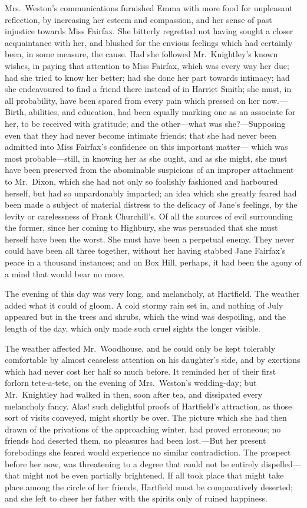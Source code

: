 Mrs.\ Weston's communications furnished Emma with more food for
unpleasant reflection, by increasing her esteem and compassion,
and her sense of past injustice towards Miss Fairfax.  She bitterly
regretted not having sought a closer acquaintance with her, and blushed
for the envious feelings which had certainly been, in some measure,
the cause.  Had she followed Mr.\ Knightley's known wishes, in paying
that attention to Miss Fairfax, which was every way her due; had she
tried to know her better; had she done her part towards intimacy;
had she endeavoured to find a friend there instead of in Harriet Smith;
she must, in all probability, have been spared from every pain
which pressed on her now.---Birth, abilities, and education,
had been equally marking one as an associate for her, to be received
with gratitude; and the other---what was she?---Supposing even that
they had never become intimate friends; that she had never been
admitted into Miss Fairfax's confidence on this important matter---%
which was most probable---still, in knowing her as she ought,
and as she might, she must have been preserved from the abominable
suspicions of an improper attachment to Mr.\ Dixon, which she had
not only so foolishly fashioned and harboured herself, but had so
unpardonably imparted; an idea which she greatly feared had been made
a subject of material distress to the delicacy of Jane's feelings,
by the levity or carelessness of Frank Churchill's.  Of all the sources
of evil surrounding the former, since her coming to Highbury,
she was persuaded that she must herself have been the worst.
She must have been a perpetual enemy.  They never could have been
all three together, without her having stabbed Jane Fairfax's peace
in a thousand instances; and on Box Hill, perhaps, it had been
the agony of a mind that would bear no more.

The evening of this day was very long, and melancholy, at Hartfield.
The weather added what it could of gloom.  A cold stormy rain set in,
and nothing of July appeared but in the trees and shrubs, which the
wind was despoiling, and the length of the day, which only made
such cruel sights the longer visible.

The weather affected Mr.\ Woodhouse, and he could only be kept tolerably
comfortable by almost ceaseless attention on his daughter's side,
and by exertions which had never cost her half so much before.
It reminded her of their first forlorn tete-a-tete, on the evening
of Mrs.\ Weston's wedding-day; but Mr.\ Knightley had walked
in then, soon after tea, and dissipated every melancholy fancy.
Alas! such delightful proofs of Hartfield's attraction, as those
sort of visits conveyed, might shortly be over.  The picture which
she had then drawn of the privations of the approaching winter,
had proved erroneous; no friends had deserted them, no pleasures
had been lost.---But her present forebodings she feared would
experience no similar contradiction.  The prospect before her now,
was threatening to a degree that could not be entirely dispelled---%
that might not be even partially brightened.  If all took place
that might take place among the circle of her friends, Hartfield must
be comparatively deserted; and she left to cheer her father with the
spirits only of ruined happiness.

